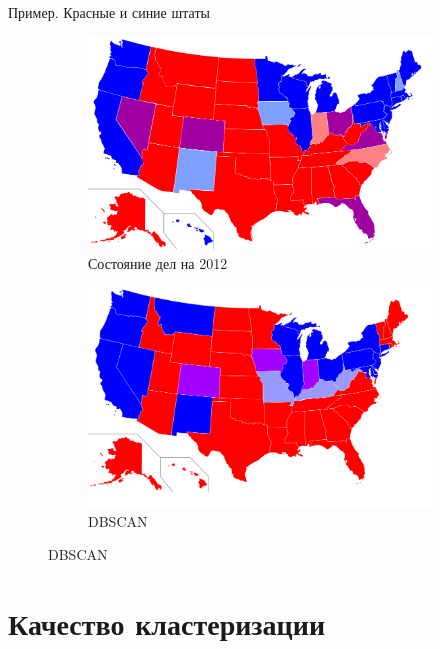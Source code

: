 \documentclass[aspectratio=169]{beamer}
\begin{document}
\begin{frame}{Пример. Красные и синие штаты}

\begin{center}
\begin{figure}
\begin{subfigure}[b]{.45\linewidth}
\includegraphics[width=1.0\textwidth]{images/redblue.png}
\caption{Состояние дел на 2012}
\end{subfigure}
\begin{subfigure}[b]{.45\linewidth}
\includegraphics[width=1.0\textwidth]{images/map_db.png}
\caption{DBSCAN}
\end{subfigure}
\end{figure}
\end{center}

\end{frame}


\section{Качество кластеризации}
\end{document}
